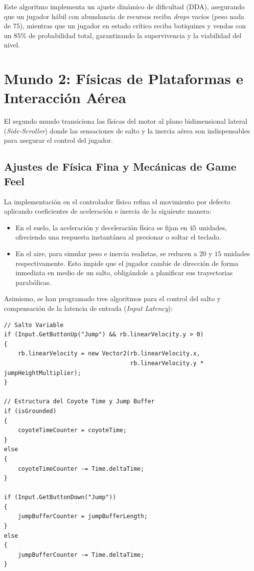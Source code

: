 Este algoritmo implementa un ajuste dinámico de dificultad (DDA), asegurando que un jugador hábil con abundancia de recursos reciba \textit{drops} vacíos (peso nada de $75$), mientras que un jugador en estado crítico reciba botiquines y vendas con un $85\%$ de probabilidad total, garantizando la supervivencia y la viabilidad del nivel.

\section{Mundo 2: Físicas de Plataformas e Interacción Aérea}
\label{sec:mecanicas_mundo2_tecnico}
El segundo mundo transiciona las físicas del motor al plano bidimensional lateral (\textit{Side-Scroller}) donde las sensaciones de salto y la inercia aérea son indispensables para asegurar el control del jugador.

\subsection{Ajustes de Física Fina y Mecánicas de Game Feel}
La implementación en el controlador físico refina el movimiento por defecto aplicando coeficientes de aceleración e inercia de la siguiente manera:
\begin{itemize}
    \item En el suelo, la aceleración y deceleración física se fijan en $45$ unidades, ofreciendo una respuesta instantánea al presionar o soltar el teclado.
    \item En el aire, para simular peso e inercia realistas, se reducen a $20$ y $15$ unidades respectivamente. Esto impide que el jugador cambie de dirección de forma inmediata en medio de un salto, obligándole a planificar sus trayectorias parabólicas.
\end{itemize}
Asimismo, se han programado tres algoritmos para el control del salto y compensación de la latencia de entrada (\textit{Input Latency}):

\begin{verbatim}
// Salto Variable
if (Input.GetButtonUp("Jump") && rb.linearVelocity.y > 0)
{
    rb.linearVelocity = new Vector2(rb.linearVelocity.x, 
                                    rb.linearVelocity.y * jumpHeightMultiplier);
}

// Estructura del Coyote Time y Jump Buffer
if (isGrounded)
{
    coyoteTimeCounter = coyoteTime;
}
else
{
    coyoteTimeCounter -= Time.deltaTime;
}

if (Input.GetButtonDown("Jump"))
{
    jumpBufferCounter = jumpBufferLength;
}
else
{
    jumpBufferCounter -= Time.deltaTime;
}
\end{verbatim}

